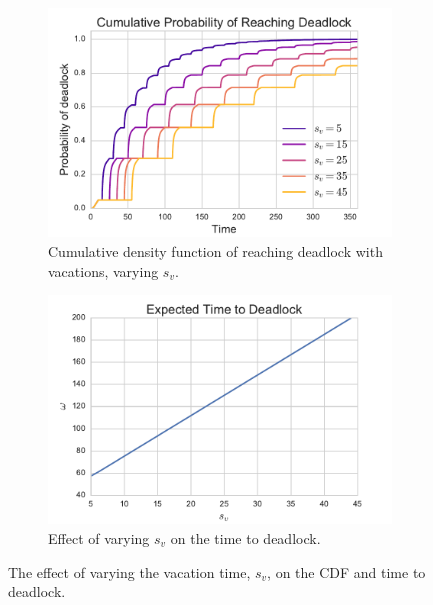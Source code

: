 \documentclass{article}
\begin{document}
\begin{figure}[!hbtp]
\begin{center}
\begin{subfigure}[b]{0.45\textwidth}
    \includegraphics[width=\textwidth]{img/cdf_vary_sv.pdf}
    \caption{Cumulative density function of reaching deadlock with vacations, varying $s_v$.}
    \label{fig:cdf_varysv}
\end{subfigure}
\begin{subfigure}[b]{0.45\textwidth}
    \includegraphics[width=\textwidth]{img/ttd_vary_sv.pdf}
    \caption{Effect of varying $s_v$ on the time to deadlock.}
    \label{fig:ttd_varysv}
\end{subfigure}
\end{center}
\caption{The effect of varying the vacation time, $s_v$, on the CDF and time to deadlock.}
\label{fig:ttdcdf_varysv}
\end{figure}
\end{document}
